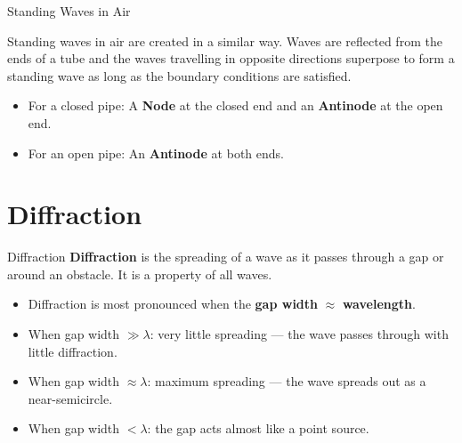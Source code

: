 \begin{keybox}{Standing Waves in Air}

Standing waves in air are created in a similar way. Waves are reflected from the ends of a tube and the waves travelling in opposite directions superpose to form a standing wave as long as the boundary conditions are satisfied.
\begin{itemize}[itemsep=2pt]
\item For a closed pipe: A \textbf{Node} at the closed end and an \textbf{Antinode} at the open end.
\item For an open pipe: An \textbf{Antinode} at both ends. 
\end{itemize}
\end{keybox}

\section{Diffraction}

\begin{definitionbox}{Diffraction}
\textbf{Diffraction} is the spreading of a wave as it passes through a gap or around an obstacle. It is a property of all waves.
\begin{itemize}[itemsep=2pt]
  \item Diffraction is most pronounced when the \textbf{gap width} $\approx$ \textbf{wavelength}.
  \item When gap width $\gg \lambda$: very little spreading — the wave passes through with little diffraction.
  \item When gap width $\approx \lambda$: maximum spreading — the wave spreads out as a near-semicircle.
  \item When gap width $< \lambda$: the gap acts almost like a point source.
\end{itemize}
\end{definitionbox}


\def\H{5.4}     %
\def\h{4.4}     %
\def\t{0.18}    %
\def\a{2.3}     %
\def\lambd{0.4} %
\def\N{14}      %
\def\dN{30}     %
\def\ang{6}    %





